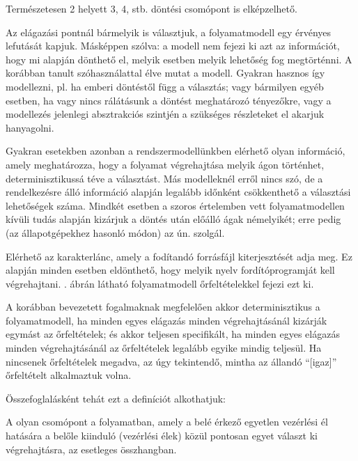 Természetesen 2 helyett 3, 4, stb.  döntési csomópont is elképzelhető.

Az elágazási pontnál bármelyik  is választjuk, a folyamatmodell egy érvényes lefutását kapjuk. Másképpen szólva: a modell nem fejezi ki azt az információt, hogy mi alapján dönthető el, melyik esetben melyik lehetőség fog megtörténni. A korábban tanult szóhasználattal élve  mutat a modell. Gyakran hasznos így modellezni, pl. ha emberi döntéstől függ a választás; vagy bármilyen egyéb esetben, ha vagy nincs rálátásunk a döntést meghatározó tényezőkre, vagy a modellezés jelenlegi absztrakciós szintjén a szükséges részleteket el akarjuk hanyagolni. 

Gyakran esetekben azonban a rendszermodellünkben elérhető olyan információ, amely meghatározza, hogy a folyamat végrehajtása melyik ágon történhet, determinisztikussá téve a választást. Más modelleknél erről nincs szó, de a rendelkezésre álló információ alapján legalább időnként csökkenthető a választási lehetőségek száma. Mindkét esetben a szoros értelemben vett folyamatmodellen kívüli tudás alapján kizárjuk a döntés után előálló ágak némelyikét; erre pedig (az állapotgépekhez hasonló módon) az ún.  szolgál. 

\begin{pelda}
Elérhető az  karakterlánc, amely a fodítandó forrásfájl kiterjesztését adja meg. Ez alapján minden esetben eldönthető, hogy melyik nyelv fordítóprogramját kell végrehajtani. . ábrán látható folyamatmodell őrfeltételekkel fejezi ezt ki.
\end{pelda}


A korábban bevezetett fogalmaknak megfelelően akkor determinisztikus a folyamatmodell, ha minden egyes elágazás minden végrehajtásánál kizárják egymást az őrfeltételek; és akkor teljesen specifikált, ha minden egyes elágazás minden végrehajtásánál az őrfeltételek legalább egyike mindig teljesül. Ha nincsenek őrfeltételek megadva, az úgy tekintendő, mintha az állandó ``[igaz]'' őrfeltételt alkalmaztuk volna.

Összefoglalásként tehát ezt a definíciót alkothatjuk:

\begin{definicio}
	A  olyan csomópont a folyamatban, amely a belé érkező egyetlen vezérlési él hatására a belőle kiinduló  (vezérlési élek) közül pontosan egyet választ ki végrehajtásra, az esetleges  összhangban.
\end{definicio}


